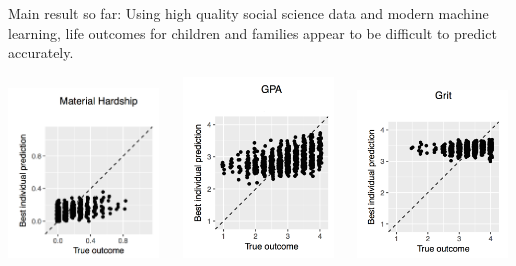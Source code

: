 \documentclass{beamer}
\begin{document}
\begin{frame}

Main result so far: Using high quality social science data and modern machine learning, life outcomes for children and families appear to be difficult to predict accurately.

\end{frame}
\begin{frame}

\begin{center}
\includegraphics[width=0.3\textwidth]{figures/materialHardshipBestIndividual}
$\quad$
\pause
\includegraphics[width=0.3\textwidth]{figures/gpaBestIndividual}
$\quad$
\pause
\includegraphics[width=0.3\textwidth]{figures/gritBestIndividual}
\end{center}

\end{frame}
\end{document}
